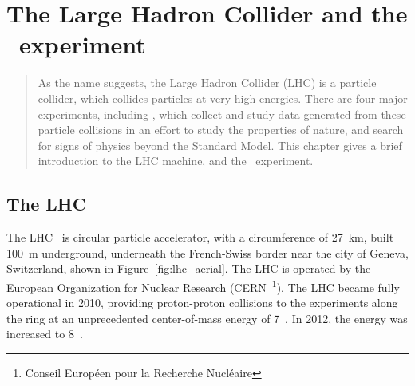 \chapter[The LHC and the \atlas\ experiment][The LHC and \atlas]
        {The Large Hadron Collider and the \atlas\ experiment}
\label{ch:lhc}

\begin{quote}
  As the name suggests, the Large Hadron Collider (LHC) is a particle collider,
  which collides particles at very high energies.
  There are four major experiments, including \atlas, which collect and study
  data generated from these particle collisions in an effort to study
  the properties of nature, and search for signs of physics beyond the Standard
  Model.
  This chapter gives a brief introduction to the LHC machine, and the
  \atlas\ experiment.
\end{quote}

\FloatBarrier
\section{The LHC}
\label{sec:lhc}

The LHC~\cite{cern-jinst-lhc} is circular particle accelerator, with a
circumference of 27~km, built 100~m underground, underneath the French-Swiss
border near the city of Geneva, Switzerland, shown in
Figure~\ref{fig:lhc_aerial}.
The LHC is operated by the European Organization for Nuclear Research
(CERN~\footnote{Conseil Europ\'een pour la Recherche Nucl\'eaire}).
The LHC became fully operational in 2010, providing proton-proton collisions
to the experiments along the ring at an unprecedented center-of-mass energy
of 7~\TeV.
In 2012, the energy was increased to 8~\TeV.


